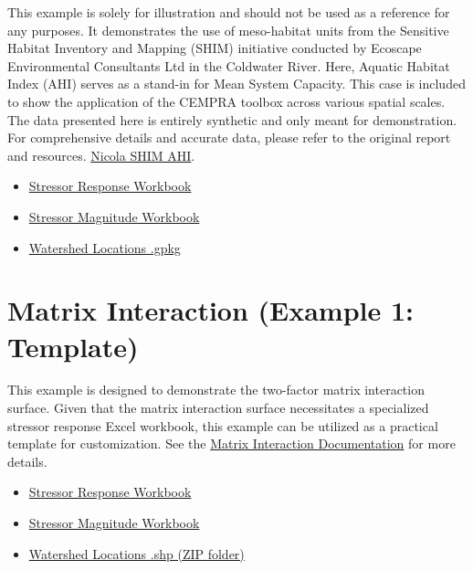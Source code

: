 \documentclass[
  letterpaper,
  DIV=11,
  numbers=noendperiod]{scrreprt}
\providecommand{\tightlist}{%
  \setlength{\itemsep}{0pt}\setlength{\parskip}{0pt}}
\begin{document}
This example is solely for illustration and should not be used as a
reference for any purposes. It demonstrates the use of meso-habitat
units from the Sensitive Habitat Inventory and Mapping (SHIM) initiative
conducted by Ecoscape Environmental Consultants Ltd in the Coldwater
River. Here, Aquatic Habitat Index (AHI) serves as a stand-in for Mean
System Capacity. This case is included to show the application of the
CEMPRA toolbox across various spatial scales. The data presented here is
entirely synthetic and only meant for demonstration. For comprehensive
details and accurate data, please refer to the original report and
resources.
\href{https://www.fraserbasin.bc.ca/Nicola_SHIM_AHI.html}{Nicola SHIM
AHI}.

\begin{itemize}
\tightlist
\item
  \href{./sample_data/nicola_shims/stressor_response_shims.xlsx}{Stressor
  Response Workbook}
\item
  \href{./sample_data/nicola_shims/stressor_magnitude_shims.xlsx}{Stressor
  Magnitude Workbook}
\item
  \href{./sample_data/nicola_shims/locations_shims.gpkg}{Watershed
  Locations .gpkg}
\end{itemize}

\section{Matrix Interaction (Example 1:
Template)}\label{matrix-interaction-example-1-template}

This example is designed to demonstrate the two-factor matrix
interaction surface. Given that the matrix interaction surface
necessitates a specialized stressor response Excel workbook, this
example can be utilized as a practical template for customization. See
the \href{./appendix_interaction_matrix.html}{Matrix Interaction
Documentation} for more details.

\begin{itemize}
\tightlist
\item
  \href{./sample_data/matrix_simple/stressor_response_matrix.xlsx}{Stressor
  Response Workbook}
\item
  \href{./sample_data/matrix_simple/stressor_magnitude_matrix.xlsx}{Stressor
  Magnitude Workbook}
\item
  \href{./sample_data/matrix_simple/poly.zip}{Watershed Locations .shp
  (ZIP folder)}
\end{itemize}
\end{document}
